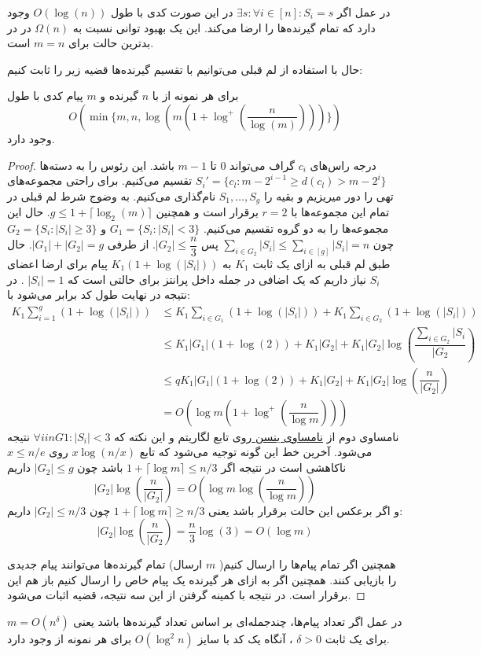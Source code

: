 \begin{remark}
	در عمل اگر 
	$\exists s: \forall i \in [n]: S_i = s$
	در این صورت کدی با طول
	$O(\log(n))$
	وجود دارد که تمام گیرنده‌ها را ارضا می‌کند. این یک بهبود توانی نسبت به
	$\Omega(n)$
	در
	\icod
	در بدترین حالت برای
	$m = n$
	است.
\end{remark}

حال با استفاده از لم قبلی می‌توانیم با تقسیم گیرنده‌ها قضیه زیر را ثابت کنیم:
\begin{theorem}
	\label{theorem:log1}
	برای هر نمونه از
	با
	$n$
	گیرنده و 
	$m$
	پیام کدی با طول
	$$O(\min\{m, n, \log(m(1 + \log^{+}(\dfrac{n}{\log(m)}) ))\})$$
	وجود دارد.
\end{theorem}
\begin{proof}
	درجه راس‌های 
	$c_i$
	گراف می‌تواند
	$0$
	تا
	$m - 1$
	باشد. این رئوس را به دسته‌ها
	$S_{i}' = \{c_l: m - 2^{i - 1} \geq d(c_l) > m -  2^i\}$
	تقسیم می‌کنیم. برای راحتی مجموعه‌های تهی را دور میریزیم و بقیه را
	$S_1, \ldots, S_g$
	نام‌گذاری می‌کنیم. به وضوج شرط لم قبلی در تمام این مجموعه‌ها با
	$r = 2$
	برقرار است و همچنین
	$g \leq 1 + \lceil\log_2(m)\rceil$.
 حال این مجموعه‌ها را به دو گروه تقسیم می‌کنیم.
	$G_1 = \{ S_i: |S_i| < 3\}$
	و 
	$G_2 = \{ S_i: |S_i| \geq 3\}$
	چون
	$\sum_{i \in G_2} |S_i| \leq \sum_{i \in [g]} |S_i| = n$
	پس
	$|G_2| \leq \dfrac{n}{3}$.
 از طرفی
	$|G_1| + |G_2| = g$.
 حال طبق لم قبلی به ازای یک ثابت
	$K_1$
	به
	$K_1(1 + \log(|S_i|))$
	پیام برای ارضا اعضای
	$S_i$
	نیاز داریم که یک اضافی در جمله داخل پرانتز برای حالتی است که
	$|S_i| = 1$
	. در نتیجه در نهایت طول کد برابر می‌شود با:
	\begin{align}
		K_1 \sum\limits_{i = 1}^{g} (1 + \log(|S_i|)) 
		& \leq K_1 \sum_{i \in G_1}	(1 + \log(|S_i|)) + K_1 \sum_{i \in G_2} (1 + \log(|S_i|)) \\
		& \leq K_1 |G_1| (1 + \log(2)) + K_1 |G_2| + K_1 |G_2| \log(\dfrac{\sum_{i\in G_2} |S_i}{|G_2}) \\
		& \leq q K_1 |G_1| (1 + \log(2)) + K_1 |G_2| + K_1 |G_2| \log(\dfrac{n}{|G_2|}) \\
		& = O(\log m (1 + \log^{+}(\dfrac{n}{\log m})))
	\end{align}
	نامساوی دوم از 
	\hyperref[Jensen]{
		نامساوی ینسن
	}
	روی تابع لگاریتم و این نکته که
	$\forall i in G1: |S_i| < 3$
	نتیجه می‌شود. آخرین خط این گونه توجیه می‌شود که تابع
	$x \log(n/x)$
	روی
	$x \leq n/e$
	ناکاهشی است در نتیجه اگر
	$1 + \lceil \log m \rceil \leq n/3$
	باشد چون
	$|G_2| \leq g$
	داریم
	$$|G_2| \log (\dfrac{n}{|G_2|}) = O(\log m \log (\dfrac{n}{\log m}))$$
	و اگر برعکس این حالت برقرار باشد یعنی
	$1 + \lceil \log m \rceil \ge n/3$
	چون 
	$|G_2| \leq n/3$
	داریم:
	$$|G_2| \log(\dfrac{n}{|G_2}) = \dfrac{n}{3} \log(3) = O(\log m)$$
	
	همچنین اگر تمام پیام‌ها را ارسال کنیم(
	$m$
	ارسال) تمام گیرنده‌ها می‌توانند پیام جدیدی را بازیابی کنند. همچنین اگر به ازای هر گیرنده یک پیام خاص را ارسال کنیم باز هم این برقرار است. در نتیجه با کمینه گرفتن از این سه نتیجه، قضیه اثبات می‌شود.
\end{proof}
در عمل اگر تعداد پیام‌ها، چندجمله‌ای بر اساس تعداد گیرنده‌ها باشد یعنی
$m = O(n^{\delta})$
برای یک ثابت
$\delta > 0$
، آنگاه یک کد با سایز
$O(\log^2 n)$
برای هر نمونه از
وجود دارد.

